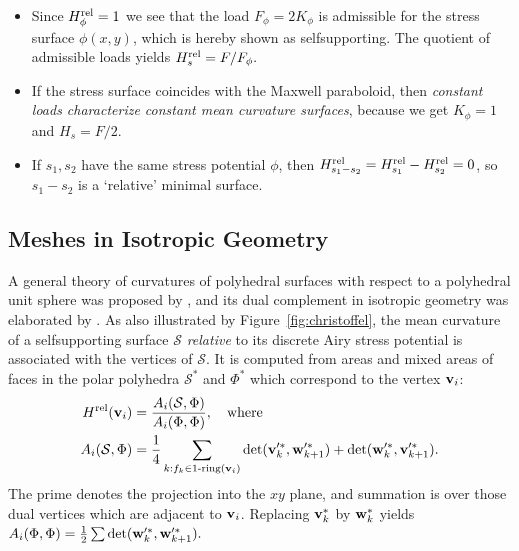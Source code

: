 \documentclass[annual]{acmsiggraph}
\def\rel{{\mathord{\text{\rm rel}}}}
\def\SS{{\mathcal S}}
\begin{document}
\begin{itemize}\itemsep-\parsep

\item Since $H^\rel_\phi=1$ we see that the load $F_\phi=2K_\phi$ is
admissible for the stress surface $\phi(x,y)$, which is hereby shown as
self\dash supporting. The quotient of admissible loads yields
	$
	 H_s^\rel = F/F_\phi.
	$

\item If the stress surface coincides with the Maxwell paraboloid, then
{\em constant loads characterize constant mean curvature surfaces},
because we get $K_\phi=1$ and $H_s=F/2$.

\item If $s_1,s_2$ have the same stress potential $\phi$, then
$H^\rel_{s_1-s_2}=H^\rel_{s_1}-H^\rel_{s_2}=0$, so $s_1-s_2$ is a
`relative' minimal surface.

\end{itemize}



\subsection{Meshes in Isotropic Geometry} \label{sec:discrete}

A general theory of curvatures of polyhedral surfaces with respect to a
polyhedral unit sphere was proposed by \cite{Pottmann2007b,bobenko-2010-ct},
and its dual complement
in isotropic geometry was elaborated by \cite{Pottmann2007}. As also
illustrated by Figure~\ref{fig:christoffel}, the mean curvature of a
self\dash supporting surface $\SS$ {\em relative} to its discrete Airy
stress potential is associated with the vertices of $\SS$. It is computed
from areas and mixed areas of faces in the polar polyhedra $\SS^*$ and
$\Phi^*$ which correspond to the vertex ${\mathbf v}_i$:
	\begin{align*}
	H^\rel(\vw_i)
	&= {A_i(\SS,\Phi) \over A_i(\Phi,\Phi)},
	\quad\text{where}
	\\
		A_i (\SS,\Phi)
	&=
		\frac{1}{4}
		\sum_{k:f_k\in \text{1-ring}(\vw_i)}
		\det(\vw'^*_k, \ww'^*_{k+1})
		+ \det(\ww'^*_k, \vw'^*_{k+1}).
	\end{align*}
 The prime denotes the projection into the $xy$ plane, and summation is
over those dual vertices which are adjacent to ${\mathbf v}_i$.
Replacing ${\mathbf v}_k^*$ by ${\mathbf w}_k^*$ yields
	$
		A_i (\Phi,\Phi)
	=
	\frac{1}{2}
		\sum
		\det({\mathbf w}'^*_k, {\mathbf w}'^*_{k+1}).
	$
\end{document}
